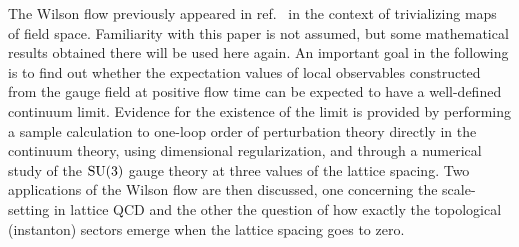 The Wilson flow previously appeared in ref.~\cite{TrivMaps}
in the context
of trivializing maps of field space.
Familiarity with this paper is not assumed, but some
mathematical results obtained there will be used here again.
An important goal in the following is to find out whether
the expectation values of local observables constructed
from the gauge field at positive flow time can be expected
to have a well-defined continuum limit.
Evidence for the existence of the limit is provided
by performing a sample calculation to one-loop order
of perturbation theory directly in the continuum theory, using
dimensional regularization, and through a
numerical study of the $\mathrm{SU(3)}$ gauge theory at three values
of the lattice spacing.
Two applications of the Wilson flow are then discussed,
one concerning the scale-setting in lattice QCD and the
other the question of
how exactly the topological (instanton) sectors emerge
when the lattice spacing goes to zero.
